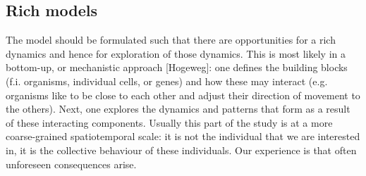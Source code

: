 \subsection{Rich models}

The model should be formulated such that there are opportunities for a rich dynamics and hence for exploration of those dynamics. This is most likely in a bottom-up, or mechanistic approach [Hogeweg]: one defines the building blocks (f.i. organisms, individual cells, or genes) and how these may interact (e.g. organisms like to be close to each other and adjust their direction of movement to the others). Next, one explores the dynamics and patterns that form as a result of these interacting components. Usually this part of the study is at a more coarse-grained spatiotemporal scale: it is not the individual that we are interested in, it is the collective behaviour of these individuals. Our experience is that often unforeseen consequences arise.
  